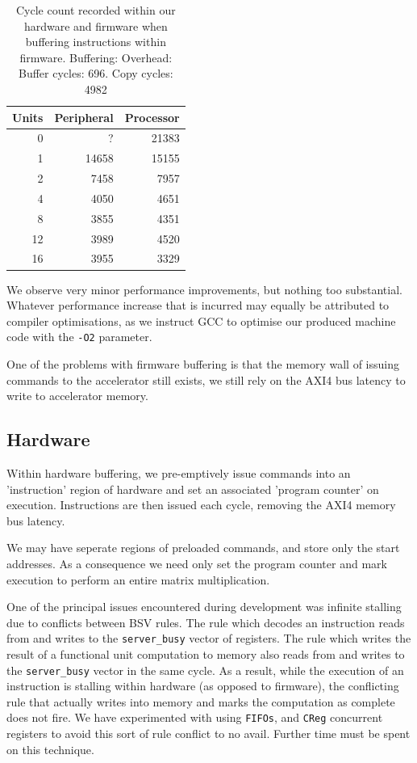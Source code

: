 \documentclass[a4paper,8pt]{report}
\begin{document}
\begin{table}
  \centering
  \begin{tabular}{r|rr}
    \toprule
    Units & Peripheral & Processor\\
    \midrule
    0&?&21383 \\
    1&14658&15155 \\
    2&7458& 7957 \\
    4&4050& 4651 \\
    8&3855& 4351 \\
    12&3989& 4520 \\
    16&3955& 3329 \\
    \bottomrule
  \end{tabular}
  \caption{Cycle count recorded within our hardware and firmware when buffering
    instructions within firmware. Buffering: Overhead: Buffer cycles: 696. Copy cycles: 4982}
\end{table}

We observe very minor performance improvements, but nothing too substantial.
Whatever performance increase that is incurred may equally be attributed to
compiler optimisations, as we instruct GCC to optimise our produced machine
code with the \texttt{-O2} parameter. 

One of the problems with firmware buffering is that the memory wall of issuing
commands to the accelerator still exists, we still rely on the AXI4 bus latency
to write to accelerator memory.

\subsection{Hardware}
Within hardware buffering, we pre-emptively issue commands into an 'instruction'
region of hardware and set an associated 'program counter' on execution.
Instructions are then issued each cycle, removing the AXI4 memory bus latency.

We may have seperate regions of preloaded commands, and store only the start
addresses. As a consequence we need only set the program counter and mark
execution to perform an entire matrix multiplication.

One of the principal issues encountered during development was infinite stalling
due to conflicts between BSV rules. The rule which decodes an
instruction reads from and writes to the \texttt{server\_busy} vector of
registers. The rule which writes the result of a functional unit computation to
memory also reads from and writes to the \texttt{server\_busy} vector in the
same cycle. As a result, while the execution of an instruction is stalling
within hardware (as opposed to firmware), the conflicting rule that actually
writes into memory and marks the computation as complete does not fire. We have
experimented with using \texttt{FIFOs}, and \texttt{CReg} concurrent registers
to avoid this sort of rule conflict to no avail. Further time must be spent on
this technique.
\end{document}

